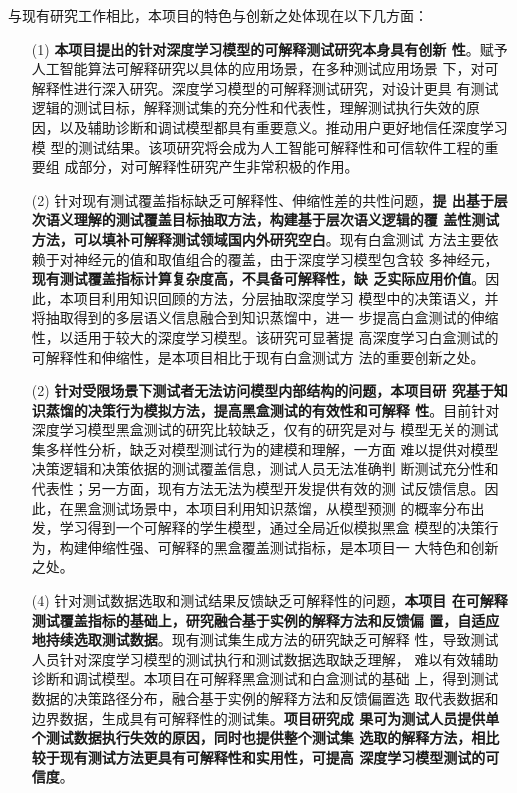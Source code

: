 与现有研究工作相比，本项目的特色与创新之处体现在以下几方面：

\begin{itemize}
    \item[(1)] \textbf{本项目提出的针对深度学习模型的可解释测试研究本身具有创新
          性}。赋予人工智能算法可解释研究以具体的应用场景，在多种测试应用场景
          下，对可解释性进行深入研究。{深度学习模型的可解释测试研究，对设计更具
          有测试逻辑的测试目标，解释测试集的充分性和代表性，理解测试执行失效的原
          因，以及辅助诊断和调试模型都具有重要意义。推动用户更好地信任深度学习模
          型的测试结果。}该项研究将会成为人工智能可解释性和可信软件工程的重要组
          成部分，对可解释性研究产生非常积极的作用。
    \item[(2)] 针对现有测试覆盖指标缺乏可解释性、伸缩性差的共性问题，\textbf{提
              出基于层次语义理解的测试覆盖目标抽取方法，构建基于层次语义逻辑的覆
              盖性测试方法，可以填补可解释测试领域国内外研究空白}。现有白盒测试
              方法主要依赖于对神经元的值和取值组合的覆盖，由于深度学习模型包含较
              多神经元，\textbf{现有测试覆盖指标计算复杂度高，不具备可解释性，缺
              乏实际应用价值}。因此，本项目利用知识回顾的方法，分层抽取深度学习
              模型中的决策语义，并将抽取得到的多层语义信息融合到知识蒸馏中，进一
              步提高白盒测试的伸缩性，以适用于较大的深度学习模型。该研究可显著提
              高深度学习白盒测试的可解释性和伸缩性，是本项目相比于现有白盒测试方
              法的重要创新之处。
    \item[(2)] \textbf{针对受限场景下测试者无法访问模型内部结构的问题，本项目研
              究基于知识蒸馏的决策行为模拟方法，提高黑盒测试的有效性和可解释
              性}。目前针对深度学习模型黑盒测试的研究比较缺乏，仅有的研究是对与
              模型无关的测试集多样性分析，缺乏对模型测试行为的建模和理解，一方面
              难以提供对模型决策逻辑和决策依据的测试覆盖信息，测试人员无法准确判
              断测试充分性和代表性；另一方面，现有方法无法为模型开发提供有效的测
              试反馈信息。因此，在黑盒测试场景中，本项目利用知识蒸馏，从模型预测
              的概率分布出发，学习得到一个可解释的学生模型，通过全局近似模拟黑盒
              模型的决策行为，构建伸缩性强、可解释的黑盒覆盖测试指标，是本项目一
              大特色和创新之处。

    \item[(4)] 针对测试数据选取和测试结果反馈缺乏可解释性的问题，\textbf{本项目
              在可解释测试覆盖指标的基础上，研究融合基于实例的解释方法和反馈偏
              置，自适应地持续选取测试数据}。现有测试集生成方法的研究缺乏可解释
              性，导致测试人员针对深度学习模型的测试执行和测试数据选取缺乏理解，
              难以有效辅助诊断和调试模型。本项目在可解释黑盒测试和白盒测试的基础
              上，得到测试数据的决策路径分布，融合基于实例的解释方法和反馈偏置选
              取代表数据和边界数据，生成具有可解释性的测试集。\textbf{项目研究成
              果可为测试人员提供单个测试数据执行失效的原因，同时也提供整个测试集
              选取的解释方法，相比较于现有测试方法更具有可解释性和实用性，可提高
              深度学习模型测试的可信度}。
\end{itemize}